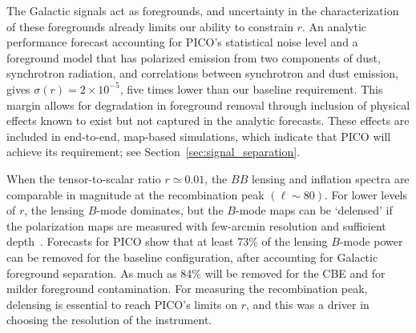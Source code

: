 \documentclass[PICOReport.tex]{subfiles}
\begin{document}
The Galactic signals act as foregrounds, and uncertainty in the characterization of these foregrounds already limits our ability to constrain $r$. 
An analytic performance forecast accounting for PICO's statistical noise level and a foreground model that has polarized emission from two components of dust, synchrotron radiation, and correlations between synchrotron and dust emission, gives $\sigma(r) = 2\times10^{-5}$, five times lower than our baseline requirement. This margin allows for degradation in foreground removal through inclusion of physical effects known to exist but not captured in the analytic forecasts. These effects are included in end-to-end, map-based simulations, which indicate that PICO will achieve its requirement; see Section~\ref{sec:signal_separation}. 



When the tensor-to-scalar ratio $r \simeq 0.01$, the $BB$ lensing and inflation spectra are comparable in magnitude at the recombination peak $(\ell \sim 80)$. For lower levels of $r$, the lensing $B$-mode dominates, but the $B$-mode maps can be `delensed' if the polarization maps are measured with few-arcmin resolution and sufficient depth~\citep{2004PhRvD..69d3005S,2012JCAP...06..014S}. Forecasts for PICO show that at least 73\% of the lensing $B$-mode power can be removed for the baseline configuration, after accounting for Galactic foreground separation. As much as 84\% will be removed for the CBE and for milder foreground contamination. For measuring the recombination peak, delensing is essential to reach PICO's limits on $r$, and this was a driver in choosing the resolution of the instrument. 
\end{document}
